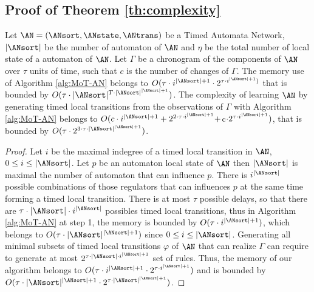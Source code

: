 \documentclass[runningheads,a4paper]{llncs}
\begin{document}
\subsection{Proof of Theorem \ref{th:complexity}}
	
	\begin{theorem}[Complexity]
		Let $\AN=(\ANsort,\ANstate,\ANtrans)$ be a Timed Automata Network,
        $|\ANsort|$ be the number of automaton of $\AN$ and $\eta$ be the total number of local state of a automaton of $\AN$.
		Let $\Gamma$ be a chronogram of the components of $\AN$ over $\tau$ units of time, such that $c$ is the number of changes of $\Gamma$.
		The memory use of Algorithm \ref{alg:MoT-AN} belongs to $O(\tau \cdot i^{|\ANsort|+1} \cdot  2^{\tau\cdot i^{|\ANsort|+1})}$
		that is bounded by $O(\tau \cdot |\ANsort|^{T\cdot  |\ANsort|^{|\ANsort|+1}})$.
		The complexity of learning $\AN$ by generating timed local transitions from the observations of $\Gamma$ with Algorithm \ref{alg:MoT-AN} belongs to
		$O(c\cdot i^{|\ANsort|+1} + 2^{2\cdot \tau \cdot  i^{|\ANsort|+1}} + $c$ \cdot  2^{\tau \cdot i^{|\ANsort|+1}})$,
        that is bounded by $O(\tau \cdot 2^{3\cdot \tau \cdot |\ANsort|^{|\ANsort|+1}})$.
		\begin{proof}
			Let $i$ be the maximal indegree of a timed local transition in $\AN$, $0 \leq i \leq |\ANsort|$.
			Let $p$ be an automaton local state of $\AN$ then $|\ANsort|$ is maximal the number of automaton that can influence $p$.
			There is $i^{|\ANsort|}$ possible combinations of those regulators that can influences $p$ at the same time forming a timed local transition.
			There is at most $\tau$ possible delays,
			so that there are $\tau \cdot |\ANsort| \cdot i^{|\ANsort|}$ possibles timed local transitions,
			thus in Algorithm \ref{alg:MoT-AN} at step 1, the memory is bounded by $O(\tau \cdot i^{|\ANsort|+1})$,
			which belongs to $O(\tau \cdot |\ANsort|^{|\ANsort|+1})$ since $0 \leq i \leq |\ANsort|$.
			Generating all minimal subsets of timed local transitions $\varphi$ of $\AN$ that can realize $\Gamma$ can require to generate at most $2^{\tau \cdot  |\ANsort| \cdot  i^{|\ANsort|+1}}$ set of rules.
			Thus, the memory of our algorithm belongs to $O(\tau \cdot  i^{|\ANsort|+1} \cdot  2^{\tau \cdot  i^{|\ANsort|+1}})$
			and is bounded by $O(\tau \cdot  |\ANsort|^{|\ANsort|+1} \cdot  2^{\tau \cdot  |\ANsort|^{|\ANsort|+1}})$.

\end{proof}
\end{theorem}
\end{document}

